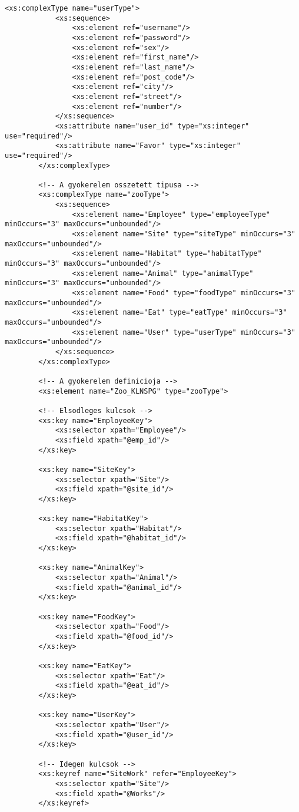 \documentclass[12pt]{report}
\begin{document}
\begin{lstlisting}[caption={Az XSD dokumentum}]
		<xs:complexType name="userType">
			<xs:sequence>
				<xs:element ref="username"/>
				<xs:element ref="password"/>
				<xs:element ref="sex"/>
				<xs:element ref="first_name"/>
				<xs:element ref="last_name"/>
				<xs:element ref="post_code"/>
				<xs:element ref="city"/>
				<xs:element ref="street"/>
				<xs:element ref="number"/>
			</xs:sequence>
			<xs:attribute name="user_id" type="xs:integer" use="required"/>
			<xs:attribute name="Favor" type="xs:integer" use="required"/>
		</xs:complexType>
		
		<!-- A gyokerelem osszetett tipusa -->
		<xs:complexType name="zooType">
			<xs:sequence>
				<xs:element name="Employee" type="employeeType" minOccurs="3" maxOccurs="unbounded"/>
				<xs:element name="Site" type="siteType" minOccurs="3" maxOccurs="unbounded"/>
				<xs:element name="Habitat" type="habitatType" minOccurs="3" maxOccurs="unbounded"/>
				<xs:element name="Animal" type="animalType" minOccurs="3" maxOccurs="unbounded"/>
				<xs:element name="Food" type="foodType" minOccurs="3" maxOccurs="unbounded"/>
				<xs:element name="Eat" type="eatType" minOccurs="3" maxOccurs="unbounded"/>
				<xs:element name="User" type="userType" minOccurs="3" maxOccurs="unbounded"/>
			</xs:sequence>
		</xs:complexType>
		
		<!-- A gyokerelem definicioja -->
		<xs:element name="Zoo_KLNSPG" type="zooType">
		
		<!-- Elsodleges kulcsok -->
		<xs:key name="EmployeeKey">
			<xs:selector xpath="Employee"/>
			<xs:field xpath="@emp_id"/>
		</xs:key>
		
		<xs:key name="SiteKey">
			<xs:selector xpath="Site"/>
			<xs:field xpath="@site_id"/>
		</xs:key>
		
		<xs:key name="HabitatKey">
			<xs:selector xpath="Habitat"/>
			<xs:field xpath="@habitat_id"/>
		</xs:key>
		
		<xs:key name="AnimalKey">
			<xs:selector xpath="Animal"/>
			<xs:field xpath="@animal_id"/>
		</xs:key>
		
		<xs:key name="FoodKey">
			<xs:selector xpath="Food"/>
			<xs:field xpath="@food_id"/>
		</xs:key>
		
		<xs:key name="EatKey">
			<xs:selector xpath="Eat"/>
			<xs:field xpath="@eat_id"/>
		</xs:key>
		
		<xs:key name="UserKey">
			<xs:selector xpath="User"/>
			<xs:field xpath="@user_id"/>
		</xs:key>
		
		<!-- Idegen kulcsok -->
		<xs:keyref name="SiteWork" refer="EmployeeKey">
			<xs:selector xpath="Site"/>
			<xs:field xpath="@Works"/>
		</xs:keyref>
		

\end{lstlisting}
\end{document}

